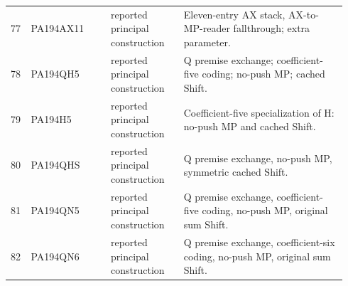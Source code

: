 \begin{longtable}{p{0.035\linewidth}p{0.23\linewidth}p{0.21\linewidth}p{0.47\linewidth}}
77 & PA194AX11 & reported principal construction & Eleven-entry AX stack, AX-to-MP-reader fallthrough; extra parameter.\\[4pt]
78 & PA194QH5 & reported principal construction & Q premise exchange; coefficient-five coding; no-push MP; cached Shift.\\[4pt]
79 & PA194H5 & reported principal construction & Coefficient-five specialization of H: no-push MP and cached Shift.\\[4pt]
80 & PA194QHS & reported principal construction & Q premise exchange, no-push MP, symmetric cached Shift.\\[4pt]
81 & PA194QN5 & reported principal construction & Q premise exchange, coefficient-five coding, no-push MP, original sum Shift.\\[4pt]
82 & PA194QN6 & reported principal construction & Q premise exchange, coefficient-six coding, no-push MP, original sum Shift.\\[4pt]
\bottomrule
\end{longtable}
\endgroup
